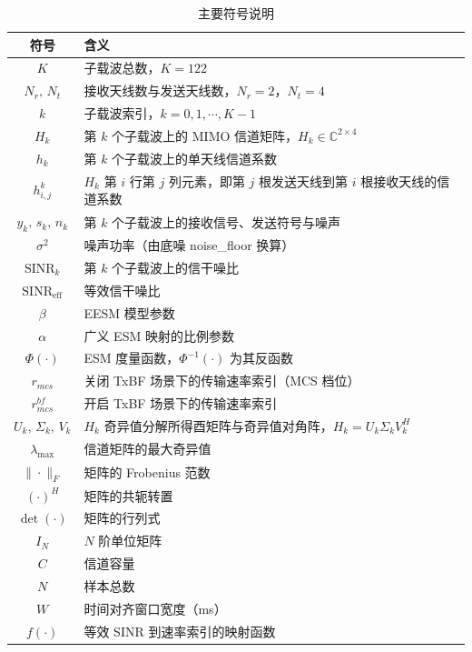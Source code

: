 \documentclass[bwprint]{gmcmthesis}
\numberwithin{figure}{section}
\begin{document}
\begin{table}[H]
	\centering
	\caption{主要符号说明}
	\label{tab:symbols}
	\begin{tabular}{cl}
		\toprule
		符号 & 含义 \\
		\midrule
		$K$ & 子载波总数，$K=122$ \\
		$N_r,\,N_t$ & 接收天线数与发送天线数，$N_r=2$，$N_t=4$ \\
		$k$ & 子载波索引，$k=0,1,\cdots,K-1$ \\
		$H_k$ & 第 $k$ 个子载波上的 MIMO 信道矩阵，$H_k\in\mathbb{C}^{2\times4}$ \\
		$h_k$ & 第 $k$ 个子载波上的单天线信道系数 \\
		$h_{i,j}^{k}$ & $H_k$ 第 $i$ 行第 $j$ 列元素，即第 $j$ 根发送天线到第 $i$ 根接收天线的信道系数 \\
		$y_k,\,s_k,\,n_k$ & 第 $k$ 个子载波上的接收信号、发送符号与噪声 \\
		$\sigma^2$ & 噪声功率（由底噪 noise\_floor 换算） \\
		$\mathrm{SINR}_k$ & 第 $k$ 个子载波上的信干噪比 \\
		$\mathrm{SINR}_{\mathrm{eff}}$ & 等效信干噪比 \\
		$\beta$ & EESM 模型参数 \\
		$\alpha$ & 广义 ESM 映射的比例参数 \\
		$\Phi(\cdot)$ & ESM 度量函数，$\Phi^{-1}(\cdot)$ 为其反函数 \\
		$r_{mcs}$ & 关闭 TxBF 场景下的传输速率索引（MCS 档位） \\
		$r_{mcs}^{bf}$ & 开启 TxBF 场景下的传输速率索引 \\
		$U_k,\,\Sigma_k,\,V_k$ & $H_k$ 奇异值分解所得酉矩阵与奇异值对角阵，$H_k=U_k\Sigma_k V_k^{H}$ \\
		$\lambda_{\max}$ & 信道矩阵的最大奇异值 \\
		$\|\cdot\|_F$ & 矩阵的 Frobenius 范数 \\
		$(\cdot)^{H}$ & 矩阵的共轭转置 \\
		$\det(\cdot)$ & 矩阵的行列式 \\
		$I_N$ & $N$ 阶单位矩阵 \\
		$C$ & 信道容量 \\
		$N$ & 样本总数 \\
		$W$ & 时间对齐窗口宽度（ms） \\
		$f(\cdot)$ & 等效 SINR 到速率索引的映射函数 \\
		\bottomrule
	\end{tabular}
\end{table}
\end{document}
